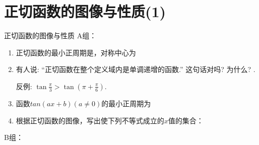 \section{正切函数的图像与性质(1)}
\zsd 正切函数的图像与性质
A组：
\begin{enumerate}
\item 正切函数的最小正周期是\blkda{$\pi$}，对称中心为
\item 有人说: ``正切函数在整个定义域内是单调递增的函数.'' 这句话对吗? 为什么? . 
\begin{jieda}
反例: $\tan\frac{\pi}{3}>\tan(\pi+\frac{\pi}{6})$. 
\end{jieda}
\item 函数$tan(ax+b)(a \neq 0)$的最小正周期为
\item 根据正切函数的图像，写出使下列不等式成立的$x$值的集合：\\
\begin{jieda}
\end{jieda}
\end{enumerate}
B组：
